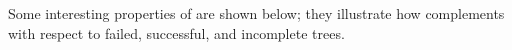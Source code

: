 


Some interesting properties of \na are shown below; they illustrate how \na
complements \step with respect to failed, successful, and incomplete trees.



